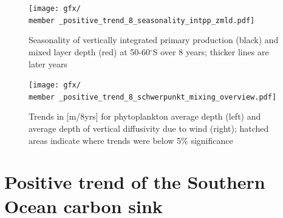 \begin{figure}[h]
\centering
\texttt{[image: gfx/\\member \_positive\_trend\_8\_seasonality\_intpp\_zmld.pdf]} %
\caption{Seasonality of vertically integrated primary production (black) and mixed layer depth (red) at 50-60$^\circ$S over 8 years; thicker lines are later years}
\label{fig:zmld_intpp_seasonality}
\end{figure}

\begin{figure}
\texttt{[image: gfx/\\member \_positive\_trend\_8\_schwerpunkt\_mixing\_overview.pdf]}
\caption{Trends in [m/8yrs] for phytoplankton average depth (left) and average depth of vertical diffusivity due to wind (right); hatched areas indicate where trends were below 5\% significance}
\label{fig:wind_mixing}
\end{figure}

\section{Positive trend of the Southern Ocean carbon sink}



